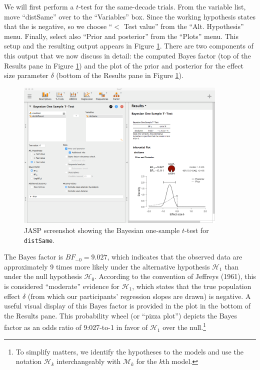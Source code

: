 \documentclass[english,,doc,floatsintext]{apa6}
\let\rmarkdownfootnote\footnote%
\def\footnote{\protect\rmarkdownfootnote}
\begin{document}
We will first perform a \(t\)-test for the same-decade trials. From the variable list, move \enquote{distSame} over to the \enquote{Variables} box. Since the working hypothesis states that the is negative, so we choose \enquote{\(<\) Test value} from the \enquote{Alt. Hypothesis} menu. Finally, select also \enquote{Prior and posterior} from the \enquote{Plots} menu. This setup and the resulting output appears in Figure \ref{fig:ttestBayes}. There are two components of this output that we now discuss in detail: the computed Bayes factor (top of the Results pane in Figure \ref{fig:ttestBayes}) and the plot of the prior and posterior for the effect size parameter \(\delta\) (bottom of the Results pane in Figure \ref{fig:ttestBayes}).

\begin{figure}
\centering
\includegraphics[width=0.9\textwidth,height=\textheight]{figures/ttestBayes.png}
\caption{\label{fig:ttestBayes}JASP screenshot showing the Bayesian one-sample \(t\)-test for \texttt{distSame}.}
\end{figure}

The Bayes factor is \(BF_{-0}=9.027\), which indicates that the observed data are approximately 9 times more likely under the alternative hypothesis \(\mathcal{H}_{1}\) than under the null hypothesis \(\mathcal{H}_{0}\). According to the convention of Jeffreys (1961), this is considered \enquote{moderate} evidence for \(\mathcal{H}_{1}\), which states that the true population effect \(\delta\) (from which our participants' regression slopes are drawn) is negative. A useful visual display of this Bayes factor is provided in the plot in the bottom of the Results pane. This probability wheel (or \enquote{pizza plot}) depicts the Bayes factor as an odds ratio of 9:027-to-1 in favor of \(\mathcal{H}_{1}\) over the null.\footnote{To simplify matters, we identify the hypotheses to the models and use the notation \( \mathcal{H}_{k} \) interchangeably with \( \mathcal{M}_{k} \) for the \( k \)th model.}
\end{document}
